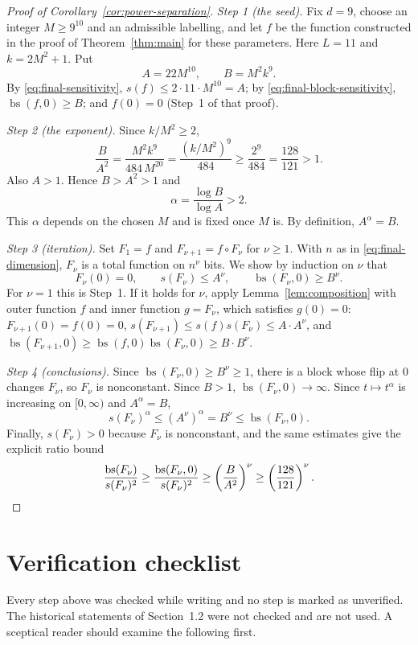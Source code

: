 \documentclass[11pt]{article}
\newcommand{\bs}{\operatorname{bs}}
\theoremstyle{definition}
\theoremstyle{remark}
\begin{document}
\begin{proof}[Proof of Corollary~\ref{cor:power-separation}]
\emph{Step 1 (the seed).} Fix \(d=9\), choose an integer \(M\geq9^{10}\) and
an admissible labelling, and let \(f\) be the function constructed in the
proof of Theorem~\ref{thm:main} for these parameters. Here \(L=11\) and
\(k=2M^2+1\). Put
\[
 A=22M^{10},\qquad B=M^2k^9.
\]
By \eqref{eq:final-sensitivity}, \(s(f)\le 2\cdot11\cdot M^{10}=A\); by
\eqref{eq:final-block-sensitivity}, \(\bs(f,0)\geq B\); and \(f(0)=0\)
(Step~1 of that proof).

\emph{Step 2 (the exponent).} Since \(k/M^2\ge2\),
\[
 \frac{B}{A^2}
   =\frac{M^2k^9}{484\,M^{20}}
   =\frac{(k/M^2)^9}{484}
   \geq\frac{2^9}{484}
   =\frac{128}{121}>1.
\]
Also \(A>1\). Hence \(B>A^2>1\) and
\[
 \alpha=\frac{\log B}{\log A}>2 .
\]
This \(\alpha\) depends on the chosen \(M\) and is fixed once \(M\) is.
By definition, \(A^\alpha=B\).

\emph{Step 3 (iteration).} Set \(F_1=f\) and
\(F_{\nu+1}=f\circ F_\nu\) for \(\nu\ge1\). With \(n\) as in
\eqref{eq:final-dimension}, \(F_\nu\) is a total function on \(n^\nu\) bits.
We show by induction on \(\nu\) that
\[
 F_\nu(0)=0,\qquad s(F_\nu)\leq A^\nu,
 \qquad
 \bs(F_\nu,0)\geq B^\nu.
\]
For \(\nu=1\) this is Step~1. If it holds for \(\nu\), apply
Lemma~\ref{lem:composition} with outer function \(f\) and inner function
\(g=F_\nu\), which satisfies \(g(0)=0\):
\(F_{\nu+1}(0)=f(0)=0\),
\(s(F_{\nu+1})\le s(f)s(F_\nu)\le A\cdot A^\nu\), and
\(\bs(F_{\nu+1},0)\ge\bs(f,0)\bs(F_\nu,0)\ge B\cdot B^\nu\).

\emph{Step 4 (conclusions).} Since \(\bs(F_\nu,0)\ge B^\nu\ge1\), there is a
block whose flip at \(0\) changes \(F_\nu\), so \(F_\nu\) is nonconstant.
Since \(B>1\), \(\bs(F_\nu,0)\to\infty\). Since \(t\mapsto t^\alpha\) is
increasing on \([0,\infty)\) and \(A^\alpha=B\),
\[
 s(F_\nu)^\alpha\leq (A^{\nu})^{\alpha}=B^\nu\leq\bs(F_\nu,0).
\]
Finally, \(s(F_\nu)>0\) because \(F_\nu\) is nonconstant, and the same
estimates give the explicit ratio bound
\[
 \frac{\bs(F_\nu)}{s(F_\nu)^2}
 \geq\frac{\bs(F_\nu,0)}{s(F_\nu)^2}
 \geq\left(\frac{B}{A^2}\right)^\nu
 \geq\left(\frac{128}{121}\right)^\nu.\qedhere
\]
\end{proof}

\section{Verification checklist}
\label{sec:checklist}

Every step above was checked while writing and no step is marked as
unverified. The historical statements of Section~1.2 were not checked and
are not used. A sceptical reader should examine the following first.
\end{document}
